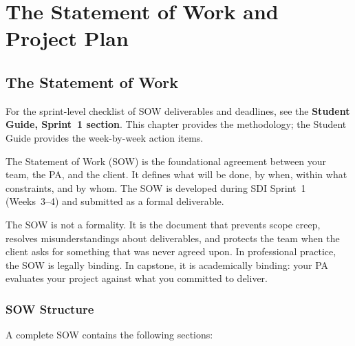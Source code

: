 \chapter{The Statement of Work and Project Plan}

\section{The Statement of Work}

\begin{tipbox}
For the sprint-level checklist of SOW deliverables and deadlines, see the \textbf{Student Guide, Sprint~1 section}. This chapter provides the methodology; the Student Guide provides the week-by-week action items.
\end{tipbox}

The Statement of Work (SOW) is the foundational agreement between your team, the PA, and the client. It defines what will be done, by when, within what constraints, and by whom. The SOW is developed during SDI Sprint~1 (Weeks~3--4) and submitted as a formal deliverable.

The SOW is not a formality. It is the document that prevents scope creep, resolves misunderstandings about deliverables, and protects the team when the client asks for something that was never agreed upon. In professional practice, the SOW is legally binding. In capstone, it is academically binding: your PA evaluates your project against what you committed to deliver.

\subsection{SOW Structure}
A complete SOW contains the following sections:

